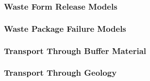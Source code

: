 
\begin{frame}[ctb!]
  \frametitle{Waste Form Release Models}
\end{frame}

\begin{frame}[ctb!]
  \frametitle{Waste Package Failure Models}
\end{frame}

\begin{frame}[ctb!]
  \frametitle{Transport Through Buffer Material}
\end{frame}

\begin{frame}[ctb!]
  \frametitle{Transport Through Geology}
\end{frame}

